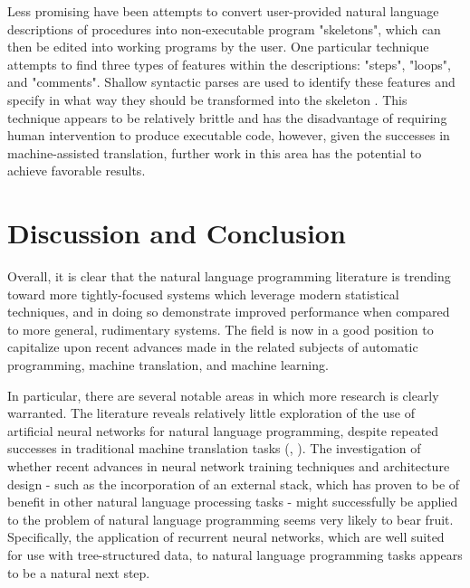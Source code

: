 \documentclass[a4paper,11pt]{proposal}
\begin{document}
Less promising have been attempts to convert user-provided natural language descriptions of procedures into non-executable program "skeletons", which can then be edited into working programs by the user. One particular technique attempts to find three types of features within the descriptions: "steps", "loops", and "comments". Shallow syntactic parses are used to identify these features and specify in what way they should be transformed into the skeleton \cite{mihalcea2006}. This technique appears to be relatively brittle and has the disadvantage of requiring human intervention to produce executable code, however, given the successes in machine-assisted translation, further work in this area has the potential to achieve favorable results.

\section{Discussion and Conclusion} \label{sec:disc}

Overall, it is clear that the natural language programming literature is trending toward more tightly-focused systems which leverage modern statistical techniques, and in doing so demonstrate improved performance when compared to more general, rudimentary systems. The field is now in a good position to capitalize upon recent advances made in the related subjects of automatic programming, machine translation, and machine learning.

In particular, there are several notable areas in which more research is clearly warranted. The literature reveals relatively little exploration of the use of artificial neural networks for natural language programming, despite repeated successes in traditional machine translation tasks (\cite{bahdanau2014}, \cite{sutskever2014}). 
The investigation of whether recent advances in neural network training techniques and architecture design - such as the incorporation of an external stack, which has proven to be of benefit in other natural language processing tasks \cite{das1992} - might successfully be applied to the problem of natural language programming seems very likely to bear fruit. Specifically, the application of recurrent neural networks, which are well suited for use with tree-structured data, to natural language programming tasks appears to be a natural next step.
\end{document}
